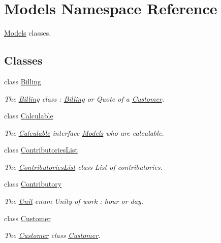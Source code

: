 \hypertarget{namespaceModels}{}\section{Models Namespace Reference}
\label{namespaceModels}


\hyperlink{namespaceModels}{Models} classes.  


\subsection*{Classes}
\begin{DoxyCompactItemize}
\item 
class \hyperlink{classModels_1_1Billing}{Billing}
\begin{DoxyCompactList}\small\item\em The \hyperlink{classModels_1_1Billing}{Billing} class \+: \hyperlink{classModels_1_1Billing}{Billing} or Quote of a \hyperlink{classModels_1_1Customer}{Customer}. \end{DoxyCompactList}\item 
class \hyperlink{classModels_1_1Calculable}{Calculable}
\begin{DoxyCompactList}\small\item\em The \hyperlink{classModels_1_1Calculable}{Calculable} interface \hyperlink{namespaceModels}{Models} who are calculable. \end{DoxyCompactList}\item 
class \hyperlink{classModels_1_1ContributoriesList}{Contributories\+List}
\begin{DoxyCompactList}\small\item\em The \hyperlink{classModels_1_1ContributoriesList}{Contributories\+List} class List of contributories. \end{DoxyCompactList}\item 
class \hyperlink{classModels_1_1Contributory}{Contributory}
\begin{DoxyCompactList}\small\item\em The \hyperlink{classModels_1_1Unit}{Unit} enum Unity of work \+: hour or day. \end{DoxyCompactList}\item 
class \hyperlink{classModels_1_1Customer}{Customer}
\begin{DoxyCompactList}\small\item\em The \hyperlink{classModels_1_1Customer}{Customer} class \hyperlink{classModels_1_1Customer}{Customer}. \end{DoxyCompactList}\item 

\end{DoxyCompactItemize}

